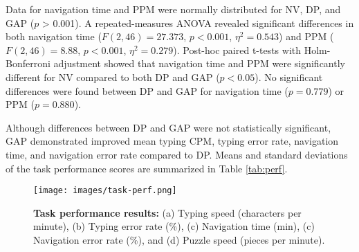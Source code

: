 Data for navigation time and PPM were normally distributed for NV, DP, and GAP ($p$ > 0.001). A repeated-measures ANOVA revealed significant differences in both navigation time (\( F(2, 46) = 27.373 \), \( p < 0.001 \), \( \eta^2 = 0.543 \)) and PPM (\( F(2, 46) = 8.88 \), \( p < 0.001 \), \(\eta^2 = 0.279 \)). Post-hoc paired t-tests with Holm-Bonferroni adjustment showed that navigation time and PPM were significantly different for NV compared to both DP and GAP (\( p < 0.05 \)). No significant differences were found between DP and GAP for navigation time (\( p = 0.779 \)) or PPM (\( p = 0.880 \)).

Although differences between DP and GAP were not statistically significant, GAP demonstrated improved mean typing CPM, typing error rate, navigation time, and navigation error rate compared to DP. Means and standard deviations of the task performance scores are summarized in Table \ref{tab:perf}.

\begin{figure*}[!ht]
  \centering
  \texttt{[image: images/task-perf.png]}
  \label{fig:task-perf}
  \caption{\textbf{Task performance results:} (a) Typing speed (characters per minute), (b) Typing error rate (\%), (c) Navigation time (min), (c) Navigation error rate (\%), and (d) Puzzle speed (pieces per minute).}
\end{figure*}

\begin{table*}[!ht]
  \caption{Mean and standard deviation of task performance scores (CPM - characters per minute, ER - error rate in typing and navigation tasks; PPM - pieces per minute in interaction task) for all conditions. The best task performance is highlighted in bold.}
  \label{tab:perf}
\end{table*}

